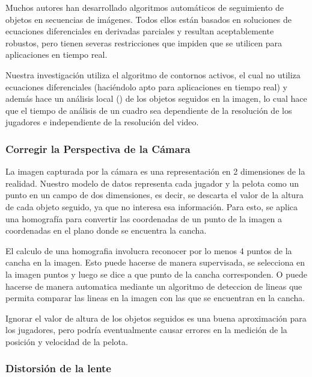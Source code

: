 \documentclass[a4paper,10pt]{article}
\begin{document}
Muchos autores han desarrollado algoritmos automáticos de seguimiento de
objetos en secuencias de imágenes\cite{IFTrace, alp, local-learning, MHT-2}.
Todos ellos están basados en soluciones de ecuaciones diferenciales en
derivadas parciales y resultan aceptablemente robustos, pero tienen severas
restricciones que impiden que se utilicen para aplicaciones en tiempo real.

Nuestra investigación utiliza el algoritmo de contornos
activos\cite{fast-level-set}, el cual no utiliza ecuaciones diferenciales
(haciéndolo apto para aplicaciones en tiempo real) y además hace un análisis
local () de los objetos seguidos en la imagen, lo cual hace que el tiempo de
análisis de un cuadro sea dependiente de la resolución de los jugadores e
independiente de la resolución del video.

\subsubsection{Corregir la Perspectiva de la Cámara}

La imagen capturada por la cámara es una representación en 2 dimensiones de
la realidad. Nuestro modelo de datos representa cada jugador y la pelota
como un punto en un campo de dos dimensiones, es decir, se descarta el valor
de la altura de cada objeto seguido, ya que no interesa esa información.
Para esto, se aplica una homografía para convertir las coordenadas de un punto de
la imagen a coordenadas en el plano donde se encuentra la cancha.

El calculo de una homografia involucra reconocer por lo menos 4 puntos de la cancha
en la imagen. Esto puede hacerse de manera supervisada, se selecciona en la imagen
puntos y luego se dice a que punto de la cancha corresponden. O puede hacerse de
manera automatica mediante un algoritmo de deteccion de lineas que permita
comparar las lineas en la imagen con las que se encuentran en la cancha.


Ignorar el valor de altura de los objetos seguidos es una buena aproximación
para los jugadores, pero podría eventualmente causar errores en la medición de
la posición y velocidad de la pelota.

\subsubsection{Distorsión de la lente}
\end{document}
